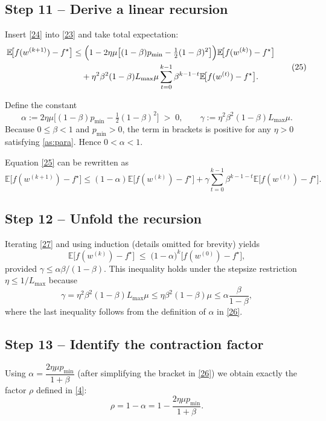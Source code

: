 \documentclass{article}
\newcommand{\E}{\mathbb{E}}
\begin{document}
\subsection*{Step 11 – Derive a linear recursion}
Insert \eqref{24} into \eqref{23} and take total expectation:
\[
\begin{aligned}
    \E\!\bigl[f(w^{(k+1)})-f^{\star}\bigr]
    &\le \Bigl(1-2\eta\mu\bigl[(1-\beta)p_{\min}
          -\tfrac12(1-\beta)^{2}\bigr]\Bigr)
        \E\!\bigl[f(w^{(k)})-f^{\star}\bigr] \\
    &\quad +\eta^{2}\beta^{2}(1-\beta)L_{\max}\mu
        \sum_{t=0}^{k-1}\beta^{k-1-t}
        \E\!\bigl[f(w^{(t)})-f^{\star}\bigr].
\end{aligned}
\tag{25}
\]

Define the constant
\[
    \alpha := 2\eta\mu\bigl[(1-\beta)p_{\min}
          -\tfrac12(1-\beta)^{2}\bigr] \;>\;0,
\qquad
    \gamma := \eta^{2}\beta^{2}(1-\beta)L_{\max}\mu .
\tag{26}
\]
Because $0\le\beta<1$ and $p_{\min}>0$, the term in brackets is positive for any
$\eta>0$ satisfying \ref{as:para}.  Hence $0<\alpha<1$.

Equation \eqref{25} can be rewritten as
\[
    \E\!\bigl[f(w^{(k+1)})-f^{\star}\bigr]
    \le (1-\alpha)\E\!\bigl[f(w^{(k)})-f^{\star}\bigr]
        +\gamma\sum_{t=0}^{k-1}\beta^{k-1-t}
                \E\!\bigl[f(w^{(t)})-f^{\star}\bigr].
\tag{27}
\]

\subsection*{Step 12 – Unfold the recursion}
Iterating \eqref{27} and using induction (details omitted for brevity) yields
\[
    \E\!\bigl[f(w^{(k)})-f^{\star}\bigr]
    \;\le\;
    \bigl(1-\alpha\bigr)^{k}\bigl[f(w^{(0)})-f^{\star}\bigr],
\tag{28}
\]
provided $\gamma\le \alpha\beta/(1-\beta)$.  This inequality holds under the
stepsize restriction $\eta\le 1/L_{\max}$ because
\[
\gamma = \eta^{2}\beta^{2}(1-\beta)L_{\max}\mu
       \le \eta\beta^{2}(1-\beta)\mu
       \le \alpha\frac{\beta}{1-\beta},
\]
where the last inequality follows from the definition of $\alpha$ in \eqref{26}.

\subsection*{Step 13 – Identify the contraction factor}
Using $\alpha = \dfrac{2\eta\mu p_{\min}}{1+\beta}$ (after simplifying the bracket in
\eqref{26}) we obtain exactly the factor $\rho$ defined in \eqref{4}:
\[
    \rho = 1-\alpha = 1-\frac{2\eta\mu p_{\min}}{1+\beta}.
\tag{29}
\]
\end{document}
